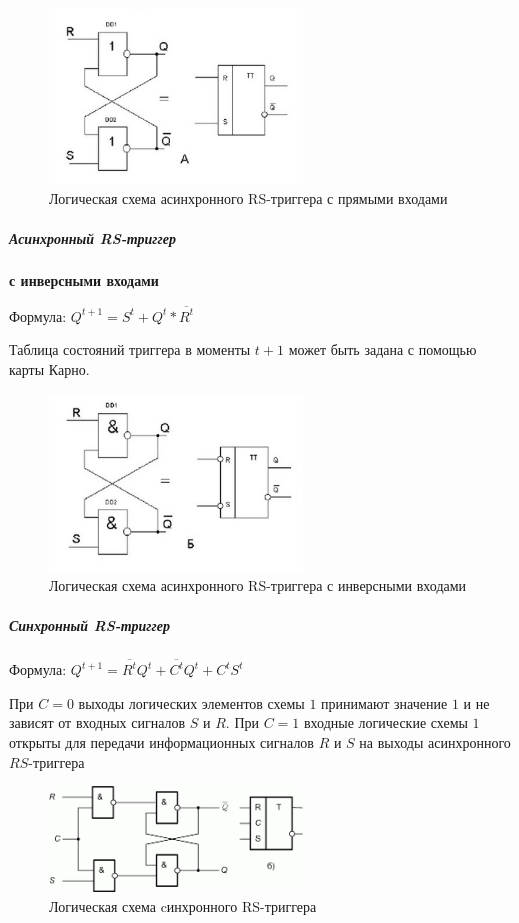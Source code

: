 \documentclass{article}
\begin{document}
\begin{flushleft}
\begin{figure}
\caption{Логическая схема асинхронного RS-триггера с прямыми входами}
\includegraphics[width=0.6\textwidth]{assets/rs_direct.jpg}
\end{figure}

\pagebreak
\subparagraph{Асинхронный RS-триггер} \textbf{с инверсными входами}

Формула: $Q^{t + 1} = S^{t} + Q^{t} * \overline{R^{t}}$

Таблица состояний триггера в моменты $t + 1$ может быть задана с помощью карты Карно.

\begin{figure}
\caption{Логическая схема асинхронного RS-триггера с инверсными входами}
\includegraphics[width=0.6\textwidth]{assets/rs_invert.jpg}
\end{figure}

\subparagraph{Синхронный RS-триггер}

Формула: $Q^{t + 1} = \overline{R^{t}} Q^{t} + \overline{C^{t}} Q^{t} + C^{t} S^{t}$

При $C = 0$ выходы логических элементов схемы $1$ принимают значение $1$ и не зависят от входных сигналов $S$ и $R$. При $C = 1$ входные логические схемы $1$ открыты для передачи информационных сигналов $R$ и $S$ на выходы асинхронного $RS$-триггера

\begin{figure}
\caption{Логическая схема cинхронного RS-триггера}
\includegraphics[width=0.6\textwidth]{assets/synchronous_rs.png}
\end{figure}


\end{flushleft}
\end{document}
